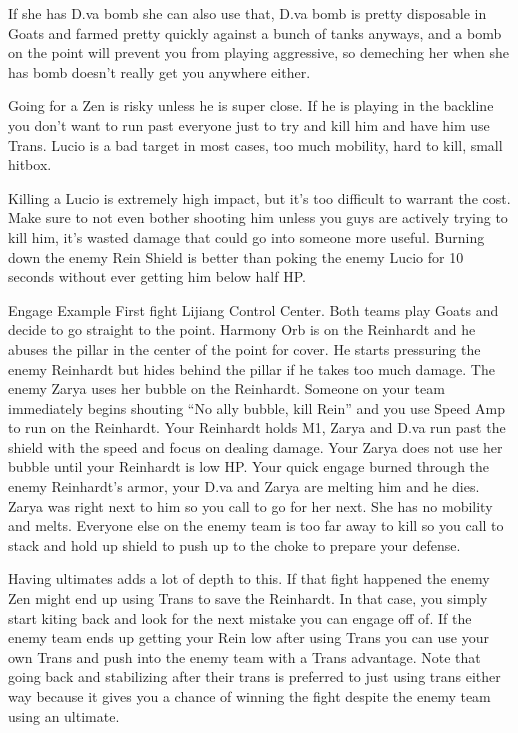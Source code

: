 If she has D.va bomb she can also use that, D.va bomb is pretty disposable in Goats and farmed pretty quickly against a bunch of tanks anyways, and a bomb on the point will prevent you from playing aggressive, so demeching her when she has bomb doesn’t really get you anywhere either.

Going for a Zen is risky unless he is super close. If he is playing in the backline you don’t want to run past everyone just to try and kill him and have him use Trans. Lucio is a bad target in most cases, too much mobility, hard to kill, small hitbox.

Killing a Lucio is extremely high impact, but it’s too difficult to warrant the cost. Make sure to not even bother shooting him unless you guys are actively trying to kill him, it’s wasted damage that could go into someone more useful. Burning down the enemy Rein Shield is better than poking the enemy Lucio for 10 seconds without ever getting him below half HP. 









Engage Example
First fight Lijiang Control Center. Both teams play Goats and decide to go straight to the point. Harmony Orb is on the Reinhardt and he abuses the pillar in the center of the point for cover. He starts pressuring the enemy Reinhardt but hides behind the pillar if he takes too much damage. The enemy Zarya uses her bubble on the Reinhardt. Someone on your team immediately begins shouting “No ally bubble, kill Rein” and you use Speed Amp to run on the Reinhardt. Your Reinhardt holds M1, Zarya and D.va run past the shield with the speed and focus on dealing damage. Your Zarya does not use her bubble until your Reinhardt is low HP. Your quick engage burned through the enemy Reinhardt's armor, your D.va and Zarya are melting him and he dies. Zarya was right next to him so you call to go for her next. She has no mobility and melts. Everyone else on the enemy team is too far away to kill so you call to stack and hold up shield to push up to the choke to prepare your defense. 

Having ultimates adds a lot of depth to this. If that fight happened the enemy Zen might end up using Trans to save the Reinhardt. In that case, you simply start kiting back and look for the next mistake you can engage off of. If the enemy team ends up getting your Rein low after using Trans you can use your own Trans and push into the enemy team with a Trans advantage. Note that going back and stabilizing after their trans is preferred to just using trans either way because it gives you a chance of winning the fight despite the enemy team using an ultimate.
 
